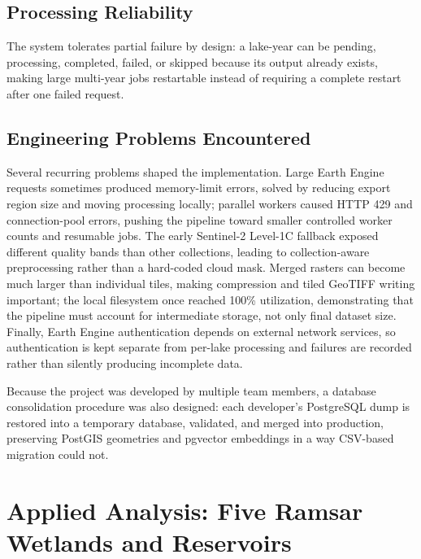 \documentclass[12pt,a4paper,oneside]{report}
\begin{document}
\section{Processing Reliability}

The system tolerates partial failure by design: a lake-year can be
pending, processing, completed, failed, or skipped because its
output already exists, making large multi-year jobs restartable
instead of requiring a complete restart after one failed request.

\section{Engineering Problems Encountered}

Several recurring problems shaped the implementation. Large Earth
Engine requests sometimes produced memory-limit errors, solved by
reducing export region size and moving processing locally; parallel
workers caused HTTP 429 and connection-pool errors, pushing the
pipeline toward smaller controlled worker counts and resumable jobs.
The early Sentinel-2 Level-1C fallback exposed different quality
bands than other collections, leading to collection-aware
preprocessing rather than a hard-coded cloud mask. Merged rasters
can become much larger than individual tiles, making compression and
tiled GeoTIFF writing important; the local filesystem once reached
100\% utilization, demonstrating that the pipeline must account for
intermediate storage, not only final dataset size. Finally, Earth
Engine authentication depends on external network services, so
authentication is kept separate from per-lake processing and
failures are recorded rather than silently producing incomplete
data.

Because the project was developed by multiple team members, a
database consolidation procedure was also designed: each developer's
PostgreSQL dump is restored into a temporary database, validated,
and merged into production, preserving PostGIS geometries and
pgvector embeddings in a way CSV-based migration could not.


\chapter{Applied Analysis: Five Ramsar Wetlands and Reservoirs}
\label{chap:ramsar}
\end{document}
